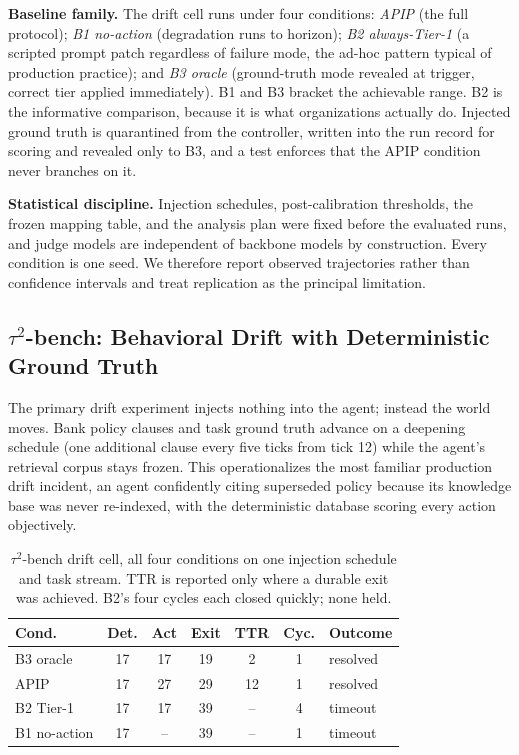\documentclass[conference]{IEEEtran}
\begin{document}
\textbf{Baseline family.} The drift cell runs under four conditions:
\emph{APIP} (the full protocol); \emph{B1 no-action} (degradation runs to
horizon); \emph{B2 always-Tier-1} (a scripted prompt patch regardless of
failure mode, the ad-hoc pattern typical of production practice); and
\emph{B3 oracle} (ground-truth mode revealed at trigger, correct tier applied
immediately). B1 and B3 bracket the achievable range. B2 is the informative
comparison, because it is what organizations actually do. Injected ground truth
is quarantined from the controller, written into the run record for scoring and
revealed only to B3, and a test enforces that the APIP condition never branches
on it.

\textbf{Statistical discipline.} Injection schedules, post-calibration
thresholds, the frozen mapping table, and the analysis plan were fixed before
the evaluated runs, and judge models are independent of backbone models by
construction. Every condition is one seed. We therefore report observed
trajectories rather than confidence intervals and treat replication as the
principal limitation.

\subsection{$\tau^2$-bench: Behavioral Drift with Deterministic Ground Truth}
\label{sec:taubench}

The primary drift experiment injects nothing into the agent; instead the world
moves. Bank policy clauses and task ground truth advance on a deepening
schedule (one additional clause every five ticks from tick 12) while the
agent's retrieval corpus stays frozen. This operationalizes the most familiar
production drift incident, an agent confidently citing superseded policy
because its knowledge base was never re-indexed, with the deterministic
database scoring every action objectively.

\begin{table}[t]
\caption{$\tau^2$-bench drift cell, all four conditions on one injection
schedule and task stream. TTR is reported only where a durable exit was
achieved. B2's four cycles each closed quickly; none held.}
\label{tab:baselines}
\centering
\footnotesize
\begin{tabular}{@{}lcccccl@{}}
\toprule
\textbf{Cond.} & \textbf{Det.} & \textbf{Act} & \textbf{Exit} & \textbf{TTR} &
\textbf{Cyc.} & \textbf{Outcome} \\
\midrule
B3 oracle      & 17 & 17   & 19 & 2  & 1 & resolved \\
APIP           & 17 & 27   & 29 & 12 & 1 & resolved \\
B2 Tier-1      & 17 & 17   & 39 & -- & 4 & timeout \\
B1 no-action   & 17 & --   & 39 & -- & 1 & timeout \\
\bottomrule
\end{tabular}
\end{table}
\end{document}
